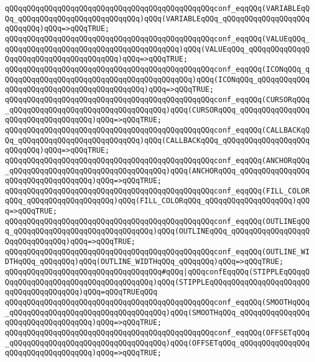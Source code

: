 \verb|qQQqqQQqqQQqqQQqqQQqqQQqqQQqqQQqqQQqqQQqqQQqqQQqconf_eqqQQq(VARIABLEqQQq_qQQqqQQqqQQqqQQqqQQqqQQqqQQq)qQQq(VARIABLEqQQq_qQQqqQQqqQQqqQQqqQQqqQQqqQQq)qQQq=>qQQqTRUE;|\newline
\verb|qQQqqQQqqQQqqQQqqQQqqQQqqQQqqQQqqQQqqQQqqQQqqQQqconf_eqqQQq(VALUEqQQq_qQQqqQQqqQQqqQQqqQQqqQQqqQQqqQQqqQQqqQQq)qQQq(VALUEqQQq_qQQqqQQqqQQqqQQqqQQqqQQqqQQqqQQqqQQqqQQq)qQQq=>qQQqTRUE;|\newline
\verb|qQQqqQQqqQQqqQQqqQQqqQQqqQQqqQQqqQQqqQQqqQQqqQQqconf_eqqQQq(ICONqQQq_qQQqqQQqqQQqqQQqqQQqqQQqqQQqqQQqqQQqqQQqqQQq)qQQq(ICONqQQq_qQQqqQQqqQQqqQQqqQQqqQQqqQQqqQQqqQQqqQQqqQQq)qQQq=>qQQqTRUE;|\newline
\verb|qQQqqQQqqQQqqQQqqQQqqQQqqQQqqQQqqQQqqQQqqQQqqQQqconf_eqqQQq(CURSORqQQq_qQQqqQQqqQQqqQQqqQQqqQQqqQQqqQQqqQQq)qQQq(CURSORqQQq_qQQqqQQqqQQqqQQqqQQqqQQqqQQqqQQqqQQq)qQQq=>qQQqTRUE;|\newline
\verb|qQQqqQQqqQQqqQQqqQQqqQQqqQQqqQQqqQQqqQQqqQQqqQQqconf_eqqQQq(CALLBACKqQQq_qQQqqQQqqQQqqQQqqQQqqQQqqQQq)qQQq(CALLBACKqQQq_qQQqqQQqqQQqqQQqqQQqqQQqqQQq)qQQq=>qQQqTRUE;|\newline
\verb|qQQqqQQqqQQqqQQqqQQqqQQqqQQqqQQqqQQqqQQqqQQqqQQqconf_eqqQQq(ANCHORqQQq_qQQqqQQqqQQqqQQqqQQqqQQqqQQqqQQqqQQq)qQQq(ANCHORqQQq_qQQqqQQqqQQqqQQqqQQqqQQqqQQqqQQqqQQq)qQQq=>qQQqTRUE;|\newline
\verb|qQQqqQQqqQQqqQQqqQQqqQQqqQQqqQQqqQQqqQQqqQQqqQQqconf_eqqQQq(FILL_COLORqQQq_qQQqqQQqqQQqqQQqqQQq)qQQq(FILL_COLORqQQq_qQQqqQQqqQQqqQQqqQQq)qQQq=>qQQqTRUE;|\newline
\verb|qQQqqQQqqQQqqQQqqQQqqQQqqQQqqQQqqQQqqQQqqQQqqQQqconf_eqqQQq(OUTLINEqQQq_qQQqqQQqqQQqqQQqqQQqqQQqqQQqqQQq)qQQq(OUTLINEqQQq_qQQqqQQqqQQqqQQqqQQqqQQqqQQqqQQq)qQQq=>qQQqTRUE;|\newline
\verb|qQQqqQQqqQQqqQQqqQQqqQQqqQQqqQQqqQQqqQQqqQQqqQQqconf_eqqQQq(OUTLINE_WIDTHqQQq_qQQqqQQq)qQQq(OUTLINE_WIDTHqQQq_qQQqqQQq)qQQq=>qQQqTRUE;|\newline
\verb|qQQqqQQqqQQqqQQqqQQqqQQqqQQqqQQqqQQq#qQQq|\verb#|qQQqconfEqqQQq(STIPPLEqQQqqQQqqQQqqQQqqQQqqQQqqQQqqQQqqQQqqQQq)qQQq(STIPPLEqQQqqQQqqQQqqQQqqQQqqQQqqQQqqQQqqQQqqQQq)qQQq=qQQqTRUEqQQq#\newline
\verb|qQQqqQQqqQQqqQQqqQQqqQQqqQQqqQQqqQQqqQQqqQQqqQQqconf_eqqQQq(SMOOTHqQQq_qQQqqQQqqQQqqQQqqQQqqQQqqQQqqQQqqQQq)qQQq(SMOOTHqQQq_qQQqqQQqqQQqqQQqqQQqqQQqqQQqqQQqqQQq)qQQq=>qQQqTRUE;|\newline
\verb|qQQqqQQqqQQqqQQqqQQqqQQqqQQqqQQqqQQqqQQqqQQqqQQqconf_eqqQQq(OFFSETqQQq_qQQqqQQqqQQqqQQqqQQqqQQqqQQqqQQqqQQq)qQQq(OFFSETqQQq_qQQqqQQqqQQqqQQqqQQqqQQqqQQqqQQqqQQq)qQQq=>qQQqTRUE;|\newline
